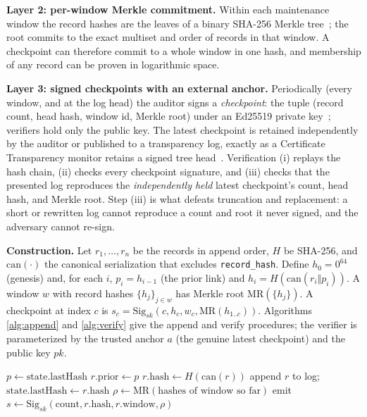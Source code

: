 \documentclass[journal]{IEEEtran}
\begin{document}
\textbf{Layer 2: per-window Merkle commitment.} Within each maintenance
window the record hashes are the leaves of a binary SHA-256 Merkle
tree~\cite{merkle1980protocols,merkle1987digital}; the root commits to the exact multiset and
order of records in that window. A checkpoint can therefore commit to a
whole window in one hash, and membership of any record can be proven in
logarithmic space.

\textbf{Layer 3: signed checkpoints with an external anchor.} Periodically
(every window, and at the log head) the auditor signs a \emph{checkpoint}:
the tuple (record count, head hash, window id, Merkle root) under an Ed25519
private key~\cite{rfc8032}; verifiers hold only the public key. The latest
checkpoint is retained independently by the auditor or published to a
transparency log, exactly as a Certificate Transparency monitor retains a
signed tree head~\cite{rfc6962}. Verification (i) replays the hash chain,
(ii) checks every checkpoint signature, and (iii) checks that the presented
log reproduces the \emph{independently held} latest checkpoint's count, head
hash, and Merkle root. Step (iii) is what defeats truncation and
replacement: a short or rewritten log cannot reproduce a count and root it
never signed, and the adversary cannot re-sign.

\textbf{Construction.} Let $r_1,\dots,r_n$ be the records in append order,
$H$ be SHA-256, and $\mathrm{can}(\cdot)$ the canonical serialization that
excludes \texttt{record\_hash}. Define $h_0=0^{64}$ (genesis) and, for each
$i$, $p_i = h_{i-1}$ (the prior link) and $h_i = H(\mathrm{can}(r_i \Vert
p_i))$. A window $w$ with record hashes $\{h_j\}_{j\in w}$ has Merkle root
$\mathrm{MR}(\{h_j\})$. A checkpoint at index $c$ is $s_c =
\mathrm{Sig}_{sk}(c, h_c, w_c, \mathrm{MR}(h_{1..c}))$. Algorithms
\ref{alg:append} and \ref{alg:verify} give the append and verify procedures;
the verifier is parameterized by the trusted anchor $a$ (the genuine latest
checkpoint) and the public key $pk$.

\begin{algorithm}[!t]
\caption{AppendRecord$(r,\ \text{state})$}
\label{alg:append}
\begin{algorithmic}[1]
\State $p \gets \text{state.lastHash}$ 
\State $r.\text{prior} \gets p$
\State $r.\text{hash} \gets H(\mathrm{can}(r))$ 
\State append $r$ to log; $\text{state.lastHash} \gets r.\text{hash}$
  \State $\rho \gets \mathrm{MR}(\text{hashes of window so far})$
  \State emit $s \gets \mathrm{Sig}_{sk}(\text{count}, r.\text{hash}, r.\text{window}, \rho)$
\EndIf
\end{algorithmic}
\end{algorithm}
\end{document}
